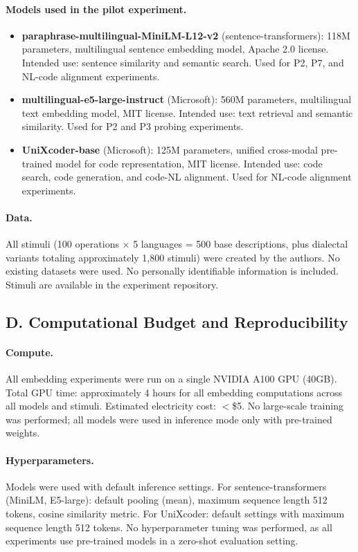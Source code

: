 \documentclass[11pt]{article}
\theoremstyle{definition}
\begin{document}
\paragraph{Models used in the pilot experiment.}
\begin{itemize}[nosep]
  \item \textbf{paraphrase-multilingual-MiniLM-L12-v2} (sentence-transformers): 118M parameters, multilingual sentence embedding model, Apache 2.0 license. Intended use: sentence similarity and semantic search. Used for P2, P7, and NL-code alignment experiments.
  \item \textbf{multilingual-e5-large-instruct} (Microsoft): 560M parameters, multilingual text embedding model, MIT license. Intended use: text retrieval and semantic similarity. Used for P2 and P3 probing experiments.
  \item \textbf{UniXcoder-base} (Microsoft): 125M parameters, unified cross-modal pre-trained model for code representation, MIT license. Intended use: code search, code generation, and code-NL alignment. Used for NL-code alignment experiments.
\end{itemize}

\paragraph{Data.}
All stimuli (100 operations $\times$ 5 languages = 500 base descriptions, plus dialectal variants totaling approximately 1,800 stimuli) were created by the authors. No existing datasets were used. No personally identifiable information is included. Stimuli are available in the experiment repository.

\subsection*{D. Computational Budget and Reproducibility}

\paragraph{Compute.}
All embedding experiments were run on a single NVIDIA A100 GPU (40GB). Total GPU time: approximately 4 hours for all embedding computations across all models and stimuli. Estimated electricity cost: $<$\$5. No large-scale training was performed; all models were used in inference mode only with pre-trained weights.

\paragraph{Hyperparameters.}
Models were used with default inference settings. For sentence-transformers (MiniLM, E5-large): default pooling (mean), maximum sequence length 512 tokens, cosine similarity metric. For UniXcoder: default settings with maximum sequence length 512 tokens. No hyperparameter tuning was performed, as all experiments use pre-trained models in a zero-shot evaluation setting.
\end{document}
